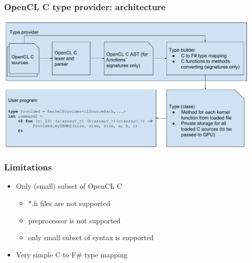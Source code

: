 \documentclass[xcolor=table]{beamer}
\begin{document}
\begin{frame}
  \transwipe[direction=90]
  \frametitle{OpenCL C type provider: architecture}
    
  \includegraphics[width=0.95\textwidth]{pictures/OpenCL_C_TP.pdf}
  \\
  \pause
\end{frame}

\begin{frame}
  \transwipe[direction=90]
  \frametitle{Limitations}
\begin{itemize}
\item Only (small) subset of OpenCL C
 \begin{itemize}
 \item *.h files are not supported
 \item preprocessor is not supported
 \item only small subset of syntax is supported
  \end{itemize}
\item Very simple C to F\# type mapping
\end{itemize}

\end{frame}
\end{document}
